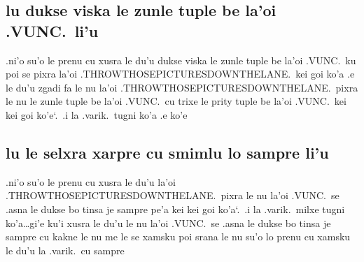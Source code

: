 \documentclass{report}
\newcommand\sds{\spacefactor\sfcode`.\ \space}
\begin{document}
\subsection{lu dukse viska le zunle tuple be la'oi .VUNC.\ li'u}
.ni'o su'o le prenu cu xusra le du'u dukse viska le zunle tuple be la'oi .VUNC.\ ku poi se pixra la'oi .THROWTHOSEPICTURESDOWNTHELANE.\ kei goi ko'a .e le du'u zgadi fa le nu la'oi .THROWTHOSEPICTURESDOWNTHELANE.\ pixra le nu le zunle tuple be la'oi .VUNC.\ cu trixe le prity tuple be la'oi .VUNC.\ kei kei goi ko'e\sds  .i la .varik.\ tugni ko'a .e ko'e

\subsection{lu le selxra xarpre cu smimlu lo sampre li'u}
.ni'o su'o le prenu cu xusra le du'u la'oi .THROWTHOSEPICTURESDOWNTHELANE.\ pixra le nu la'oi .VUNC.\ se .asna le dukse bo tinsa je sampre pe'a kei kei goi ko'a\sds  .i la .varik.\ milxe tugni ko'a\ldots gi'e ku'i xusra le du'u le nu la'oi .VUNC.\ se .asna le dukse bo tinsa je sampre cu kakne le nu me le se xamsku poi srana le nu su'o lo prenu cu xamsku le du'u la .varik.\ cu sampre
\end{document}
